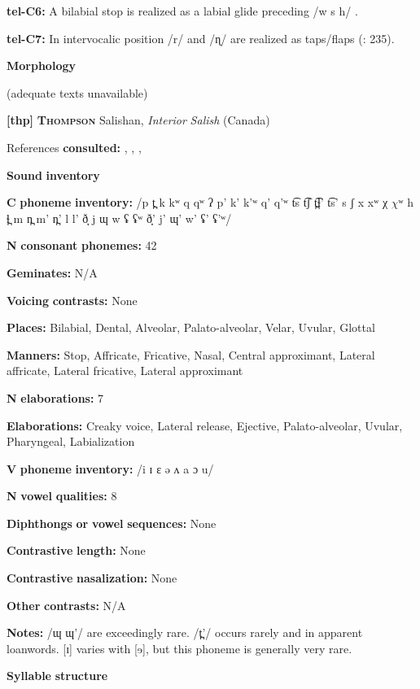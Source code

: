 \begin{styleBody}
\textbf{tel-C6:} A bilabial stop is realized as a labial glide preceding /w s h/ \citep[207]{Krishnamurti1998}.

\textbf{tel-C7:} In intervocalic position /r/ and /ɳ/ are realized as taps/flaps (\citealt{BhaskararaoRay2017}: 235).

\textbf{Morphology}

(adequate texts unavailable)

\textbf{[thp]}   \textbf{\textsc{Thompson}}  Salishan, \textit{Interior} \textit{Salish} (Canada)

References \textbf{consulted:} \citet{Koch2008}, \citet{ThompsonThompson1992}, \citet{ThompsonThompson1996}, \citet{ThompsonEtAl1996}

\textbf{Sound} \textbf{inventory}

\textbf{C} \textbf{phoneme} \textbf{inventory:} /p t̪ k kʷ q qʷ ʔ p’ k’ k’ʷ q’ q’ʷ t͡s t͡ʃ t̪͡ɬ’ t͡s’ s ʃ x xʷ χ $\chi ʷ$ h ɬ̪ m n̪ m’ n̪’ l l’ ð̞ j ɰ w ʢ ʢʷ ð̞’ j’ ɰ’ w’ ʢ’ ʢ’ʷ/

\textbf{N} \textbf{consonant} \textbf{phonemes:} 42

\textbf{Geminates:} N/A

\textbf{Voicing} \textbf{contrasts:} None

\textbf{Places:} Bilabial, Dental, Alveolar, Palato-alveolar, Velar, Uvular, Glottal 

\textbf{Manners:} Stop, Affricate, Fricative, Nasal, Central approximant, Lateral affricate, Lateral fricative, Lateral approximant

\textbf{N} \textbf{elaborations:} 7

\textbf{Elaborations:} Creaky voice, Lateral release, Ejective, Palato-alveolar, Uvular, Pharyngeal, Labialization

\textbf{V} \textbf{phoneme} \textbf{inventory:} /i ɪ ɛ ə ʌ a ɔ u/

\textbf{N} \textbf{vowel} \textbf{qualities:} 8

\textbf{Diphthongs} \textbf{or} \textbf{vowel} \textbf{sequences:} None

\textbf{Contrastive} \textbf{length:} None

\textbf{Contrastive} \textbf{nasalization:} None

\textbf{Other} \textbf{contrasts:} N/A

\textbf{Notes:} /ɰ ɰ’/ are exceedingly rare. /t̪’/ occurs rarely and in apparent loanwords. [ɪ] varies with [ɘ], but this phoneme is generally very rare.

\textbf{Syllable} \textbf{structure}


\end{styleBody}
